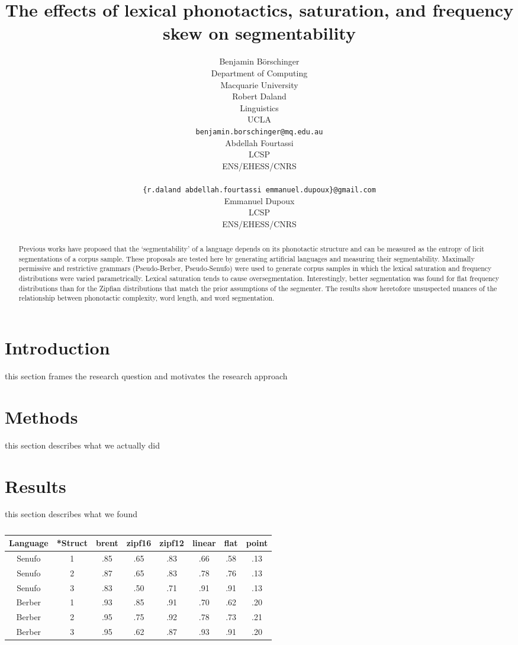 \documentclass[11pt]{article}
\title{The effects of lexical phonotactics, saturation,
  and frequency skew on segmentability}
\author{Benjamin B{\"o}rschinger \\
    Department of Computing \\
    Macquarie University \\\And
  Robert Daland \\
    Linguistics \\
    UCLA \\
    {\tt benjamin.borschinger@mq.edu.au} \\\And
  Abdellah Fourtassi \\
    LCSP \\
    ENS/EHESS/CNRS \\
    \\
    {\tt \{r.daland\,abdellah.fourtassi\,emmanuel.dupoux\}@gmail.com} \\\And
  Emmanuel Dupoux \\
    LCSP \\
    ENS/EHESS/CNRS }
\date{}
\begin{document}
\maketitle
\begin{abstract}
  Previous works have proposed that the `segmentability' of a language
  depends on its phonotactic structure and can be measured as the
  entropy of licit segmentations of a corpus sample. These proposals
  are tested here by generating artificial languages and measuring
  their segmentability. Maximally permissive and restrictive grammars
  (Pseudo-Berber, Pseudo-Senufo) were used to generate corpus samples 
  in which the lexical saturation and frequency distributions were
  varied parametrically. Lexical saturation tends to cause oversegmentation.
  Interestingly, better segmentation was found for flat frequency
  distributions than for the Zipfian distributions that match the
  prior assumptions of the segmenter. The results show heretofore
  unsuspected nuances of the relationship between phonotactic complexity,
  word length, and word segmentation.
\end{abstract}

\section{Introduction}

this section frames the research question and motivates the research approach

\section{Methods}

this section describes what we actually did

\section{Results}

this section describes what we found

\begin{table}[h]
\begin{center}
\begin{tabular}{c||c|cccccc}
  \hline
  Language & *Struct & brent & zipf16 & zipf12 & linear & flat & point \\
  \hline
  Senufo & 1 & .85 & .65 & .83 & .66 & .58 & .13 \\
  Senufo & 2 & .87 & .65 & .83 & .78 & .76 & .13 \\
  Senufo & 3 & .83 & .50 & .71 & .91 & .91 & .13 \\
  \hline
  Berber & 1 & .93 & .85 & .91 & .70 & .62 & .20 \\
  Berber & 2 & .95 & .75 & .92 & .78 & .73 & .21 \\
  Berber & 3 & .95 & .62 & .87 & .93 & .91 & .20 \\
\end{tabular}
\end{center}
\caption{\label{Results.}}
\end{table}
\end{document}
